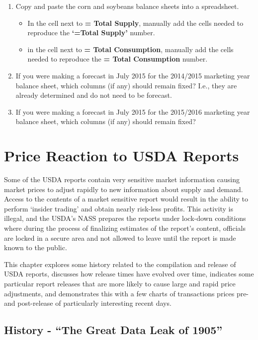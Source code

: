 \documentclass[]{book}
\providecommand{\tightlist}{%
  \setlength{\itemsep}{0pt}\setlength{\parskip}{0pt}}
\theoremstyle{definition}
\theoremstyle{definition}
\theoremstyle{remark}
\begin{document}
\begin{enumerate}
\def\labelenumi{\arabic{enumi}.}
\item
  Copy and paste the corn and soybeans balance sheets into a
  spreadsheet.

  \begin{itemize}
  \tightlist
  \item
    In the cell next to \textbf{= Total Supply}, manually add the cells
    needed to reproduce the \textbf{`=Total Supply'} number.
  \item
    in the cell next to \textbf{= Total Consumption}, manually add the
    cells needed to reproduce the \textbf{= Total Consumption} number.
  \end{itemize}
\item
  If you were making a forecast in July 2015 for the 2014/2015 marketing
  year balance sheet, which columns (if any) should remain fixed? I.e.,
  they are already determined and do not need to be forecast.
\item
  If you were making a forecast in July 2015 for the 2015/2016 marketing
  year balance sheet, which columns (if any) should remain fixed?
\end{enumerate}

\chapter{Price Reaction to USDA
Reports}\label{price-reaction-to-usda-reports}

Some of the USDA reports contain very sensitive market information
causing market prices to adjust rapidly to new information about supply
and demand. Access to the contents of a market sensitive report would
result in the ability to perform `insider trading' and obtain nearly
risk-less profits. This activity is illegal, and the USDA's NASS
prepares the reports under lock-down conditions where during the process
of finalizing estimates of the report's content, officials are locked in
a secure area and not allowed to leave until the report is made known to
the public.

This chapter explores some history related to the compilation and
release of USDA reports, discusses how release times have evolved over
time, indicates some particular report releases that are more likely to
cause large and rapid price adjustments, and demonstrates this with a
few charts of transactions prices pre- and post-release of particularly
interesting recent days.

\section{\texorpdfstring{History - ``The Great Data Leak of
1905''}{History - The Great Data Leak of 1905}}\label{history---the-great-data-leak-of-1905}
\end{document}
